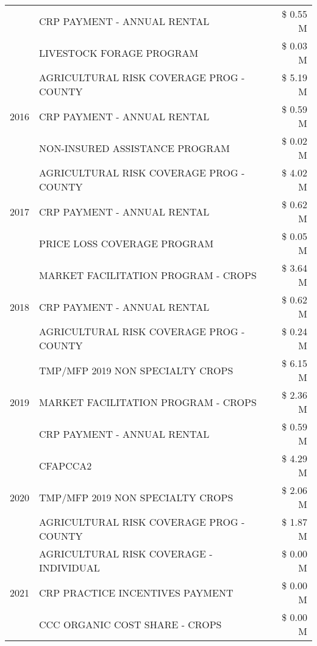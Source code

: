 \begin{tabular}{llr}
 & CRP PAYMENT - ANNUAL RENTAL & \$ 0.55 M \\
 & LIVESTOCK FORAGE PROGRAM & \$ 0.03 M \\
\cline{1-3}
\multirow[t]{3}{*}{2016} & AGRICULTURAL RISK COVERAGE PROG - COUNTY      & \$ 5.19 M \\
 & CRP PAYMENT - ANNUAL RENTAL                   & \$ 0.59 M \\
 & NON-INSURED ASSISTANCE PROGRAM                & \$ 0.02 M \\
\cline{1-3}
\multirow[t]{3}{*}{2017} & AGRICULTURAL RISK COVERAGE PROG - COUNTY & \$ 4.02 M \\
 & CRP PAYMENT - ANNUAL RENTAL & \$ 0.62 M \\
 & PRICE LOSS COVERAGE PROGRAM & \$ 0.05 M \\
\cline{1-3}
\multirow[t]{3}{*}{2018} & MARKET FACILITATION PROGRAM - CROPS & \$ 3.64 M \\
 & CRP PAYMENT - ANNUAL RENTAL & \$ 0.62 M \\
 & AGRICULTURAL RISK COVERAGE PROG - COUNTY & \$ 0.24 M \\
\cline{1-3}
\multirow[t]{3}{*}{2019} & TMP/MFP 2019 NON SPECIALTY CROPS & \$ 6.15 M \\
 & MARKET FACILITATION PROGRAM - CROPS & \$ 2.36 M \\
 & CRP PAYMENT - ANNUAL RENTAL & \$ 0.59 M \\
\cline{1-3}
\multirow[t]{3}{*}{2020} & CFAPCCA2 & \$ 4.29 M \\
 & TMP/MFP 2019 NON SPECIALTY CROPS & \$ 2.06 M \\
 & AGRICULTURAL RISK COVERAGE PROG - COUNTY & \$ 1.87 M \\
\cline{1-3}
\multirow[t]{3}{*}{2021} & AGRICULTURAL RISK COVERAGE - INDIVIDUAL & \$ 0.00 M \\
 & CRP PRACTICE INCENTIVES PAYMENT & \$ 0.00 M \\
 & CCC ORGANIC COST SHARE - CROPS & \$ 0.00 M \\
\cline{1-3}
\bottomrule
\end{tabular}
